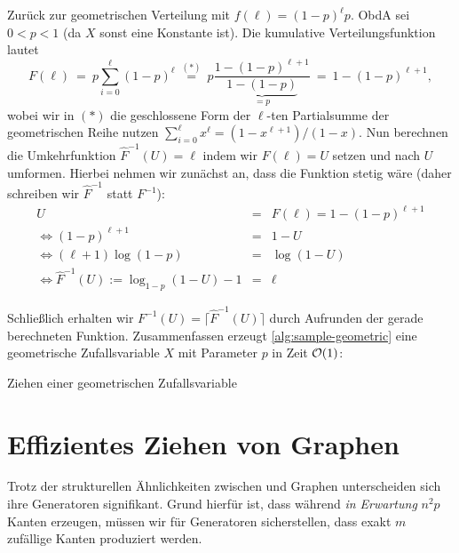 Zurück  zur geometrischen Verteilung mit $f(\ell) = (1-p)^\ell p$.
ObdA sei $0 < p < 1$ (da $X$ sonst eine Konstante ist).
Die kumulative Verteilungsfunktion lautet
\begin{equation}
    F(\ell)
    \ =\ p \sum_{i=0}^\ell (1-p)^\ell
    \ \stackrel{(*)}{=} \ p \frac{1 - (1-p)^{\ell+1}}{\underbrace{1 - (1-p)}_{=p}}
    \ = \ 1 - (1-p)^{\ell+1},
\end{equation}
wobei wir in $(*)$ die geschlossene Form der $\ell$-ten Partialsumme der geometrischen Reihe nutzen $\sum_{i=0}^\ell x^\ell = (1 - x^{\ell+1})/(1 - x)$.
Nun berechnen die Umkehrfunktion $\hat F^{-1}(U) = \ell$ indem wir $F(\ell) = U$ setzen und nach $U$ umformen.
Hierbei nehmen wir zunächst an, dass die Funktion stetig wäre (daher schreiben wir $\hat F ^{-1}$ statt $F^{-1}$):
\begin{eqnarray}
    U &=& F(\ell) = 1 - (1-p)^{\ell+1} \\
    \Leftrightarrow (1-p)^{\ell+1} &=& 1 - U \\
    \Leftrightarrow  (\ell+1) \log(1-p)  &=& \log(1 - U) \\
    \Leftrightarrow  \hat F^{-1}(U) := \log_{1-p}(1 - U) - 1 &=& \ell \label{eq:inverse-hat}
\end{eqnarray}

Schließlich erhalten wir $F^{-1}(U) = \lceil \hat F^{-1} (U) \rceil$ durch Aufrunden der gerade berechneten Funktion.
Zusammenfassen erzeugt \cref{alg:sample-geometric} eine geometrische Zufallsvariable $X$ mit Parameter $p$ in Zeit $\mathcal{O}\!\left(1\right)$:

\begin{algorithm}[H]
    \Else{$U \gets \text{ziehen uniform aus $[0, 1)$}$\;
    Gebe $\lceil \log_{1-p}(1 - U) - 1\rceil$ zurück.}
    \caption{Ziehen einer geometrischen Zufallsvariable}
    \label{alg:sample-geometric}
\end{algorithm}

\bigskip
\bigskip

\section{Effizientes Ziehen von \Gnm Graphen}\label{sec:sampling_gnm}
Trotz der strukturellen Ähnlichkeiten zwischen \Gnp und \Gnm Graphen unterscheiden sich ihre Generatoren signifikant.
Grund hierfür ist, dass während \Gnp \emph{in Erwartung} $n^2p$ Kanten erzeugen, müssen wir für \Gnm Generatoren sicherstellen, dass exakt $m$ zufällige Kanten produziert werden.

